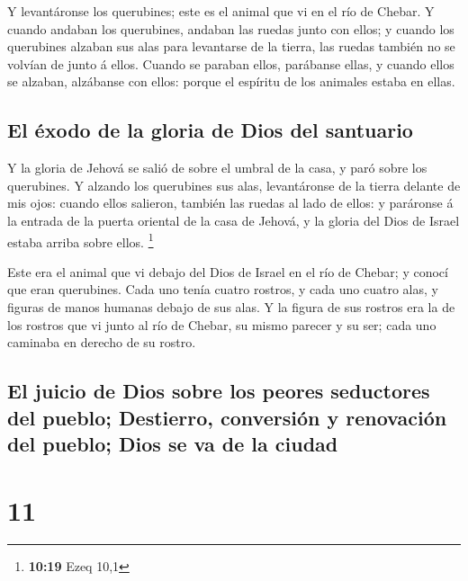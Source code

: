  Y levantáronse los querubines; este es el animal que vi en
el río de Chebar.  Y cuando andaban los querubines, andaban
las ruedas junto con ellos; y cuando los querubines alzaban sus alas
para levantarse de la tierra, las ruedas también no se volvían de junto
á ellos.  Cuando se paraban ellos, parábanse ellas, y
cuando ellos se alzaban, alzábanse con ellos: porque el espíritu de los
animales estaba en ellas.

\hypertarget{el-uxe9xodo-de-la-gloria-de-dios-del-santuario}{%
\subsection{El éxodo de la gloria de Dios del
santuario}\label{el-uxe9xodo-de-la-gloria-de-dios-del-santuario}}

 Y la gloria de Jehová se salió de sobre el umbral de la
casa, y paró sobre los querubines.  Y alzando los
querubines sus alas, levantáronse de la tierra delante de mis ojos:
cuando ellos salieron, también las ruedas al lado de ellos: y paráronse
á la entrada de la puerta oriental de la casa de Jehová, y la gloria del
Dios de Israel estaba arriba sobre ellos. \footnote{\textbf{10:19} Ezeq
  10,1}

 Este era el animal que vi debajo del Dios de Israel en el
río de Chebar; y conocí que eran querubines.  Cada uno
tenía cuatro rostros, y cada uno cuatro alas, y figuras de manos humanas
debajo de sus alas.  Y la figura de sus rostros era la de
los rostros que vi junto al río de Chebar, su mismo parecer y su ser;
cada uno caminaba en derecho de su rostro.

\hypertarget{el-juicio-de-dios-sobre-los-peores-seductores-del-pueblo-destierro-conversiuxf3n-y-renovaciuxf3n-del-pueblo-dios-se-va-de-la-ciudad}{%
\subsection{El juicio de Dios sobre los peores seductores del pueblo;
Destierro, conversión y renovación del pueblo; Dios se va de la
ciudad}\label{el-juicio-de-dios-sobre-los-peores-seductores-del-pueblo-destierro-conversiuxf3n-y-renovaciuxf3n-del-pueblo-dios-se-va-de-la-ciudad}}

\hypertarget{section-10}{%
\section{11}\label{section-10}}

